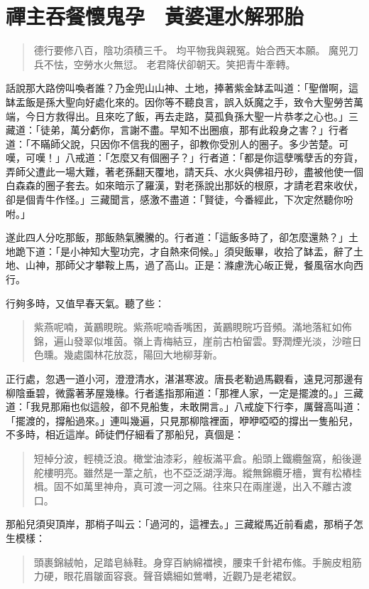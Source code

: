 
\chapter{禪主吞餐懷鬼孕　黃婆運水解邪胎}

\begin{quote}
德行要修八百，陰功須積三千。
均平物我與親冤。始合西天本願。
魔兕刀兵不怯，空勞水火無愆。
老君降伏卻朝天。笑把青牛牽轉。
\end{quote}

話說那大路傍叫喚者誰？乃金兜山山神、土地，捧著紫金缽盂叫道：「聖僧啊，這缽盂飯是孫大聖向好處化來的。因你等不聽良言，誤入妖魔之手，致令大聖勞苦萬端，今日方救得出。且來吃了飯，再去走路，莫孤負孫大聖一片恭孝之心也。」三藏道：「徒弟，萬分虧你，言謝不盡。早知不出圈痕，那有此殺身之害？」行者道：「不瞞師父說，只因你不信我的圈子，卻教你受別人的圈子。多少苦楚。可嘆，可嘆！」八戒道：「怎麼又有個圈子？」行者道：「都是你這孽嘴孽舌的夯貨，弄師父遭此一場大難，著老孫翻天覆地，請天兵、水火與佛祖丹砂，盡被他使一個白森森的圈子套去。如來暗示了羅漢，對老孫說出那妖的根原，才請老君來收伏，卻是個青牛作怪。」三藏聞言，感激不盡道：「賢徒，今番經此，下次定然聽你吩咐。」

遂此四人分吃那飯，那飯熱氣騰騰的。行者道：「這飯多時了，卻怎麼還熱？」土地跪下道：「是小神知大聖功完，才自熱來伺候。」須臾飯畢，收拾了缽盂，辭了土地、山神，那師父才攀鞍上馬，過了高山。正是：滌慮洗心皈正覺，餐風宿水向西行。

行夠多時，又值早春天氣。聽了些：
\begin{quote}
紫燕呢喃，黃鸝睍睆。紫燕呢喃香嘴困，黃鸝睍睆巧音頻。滿地落紅如佈錦，遍山發翠似堆茵。嶺上青梅結豆，崖前古柏留雲。野潤煙光淡，沙暄日色曛。幾處園林花放蕊，陽回大地柳芽新。
\end{quote}

正行處，忽遇一道小河，澄澄清水，湛湛寒波。唐長老勒過馬觀看，遠見河那邊有柳陰垂碧，微露著茅屋幾椽。行者遙指那廂道：「那裡人家，一定是擺渡的。」三藏道：「我見那廂也似這般，卻不見船隻，未敢開言。」八戒旋下行李，厲聲高叫道：「擺渡的，撐船過來。」連叫幾遍，只見那柳陰裡面，咿咿啞啞的撐出一隻船兒，不多時，相近這岸。師徒們仔細看了那船兒，真個是：
\begin{quote}
短棹分波，輕橈泛浪。橄堂油漆彩，艎板滿平倉。船頭上鐵纜盤窩，船後邊舵樓明亮。雖然是一葦之航，也不亞泛湖浮海。縱無錦纜牙檣，實有松樁桂楫。固不如萬里神舟，真可渡一河之隔。往來只在兩崖邊，出入不離古渡口。
\end{quote}

那船兒須臾頂岸，那梢子叫云：「過河的，這裡去。」三藏縱馬近前看處，那梢子怎生模樣：
\begin{quote}
頭裹錦絨帕，足踏皂絲鞋。身穿百納綿襠襖，腰束千針裙布絛。手腕皮粗筋力硬，眼花眉皺面容衰。聲音嬌細如鶯囀，近觀乃是老裙釵。
\end{quote}

